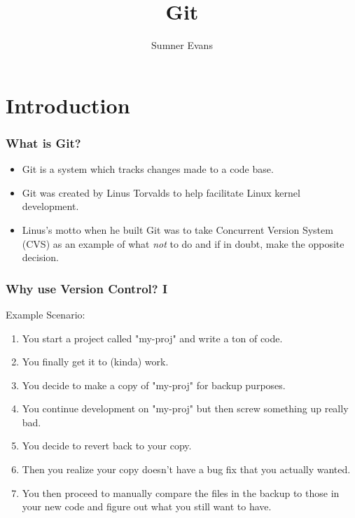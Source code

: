 \documentclass{lug}
\title{Git}
\author{Sumner Evans}
\begin{document}
\section{Introduction}

\begin{frame}
    \frametitle{What is Git?}

    \begin{itemize}[<+->]
        \item Git is a system which tracks changes made to a code base.
        \item Git was created by Linus Torvalds to help facilitate Linux kernel
            development.
        \item Linus's motto when he built Git was to take Concurrent Version
            System (CVS) as an example of what \textit{not} to do and if in
            doubt, make the opposite decision.  \footnotemark
    \end{itemize}

\end{frame}

\begin{frame}
    \frametitle{Why use Version Control? I}

    Example Scenario:

    \begin{enumerate}[<+->]
        \item You start a project called "my-proj" and write a ton of code.
        \item You finally get it to (kinda) work.
        \item You decide to make a copy of "my-proj" for backup purposes.
        \item You continue development on "my-proj" but then screw something up
            really bad.
        \item You decide to revert back to your copy.
        \item Then you realize your copy doesn't have a bug fix that you
            actually wanted.
        \item You then proceed to manually compare the files in the backup to
            those in your new code and figure out what you still want to have.
    \end{enumerate}

\end{frame}
\end{document}
